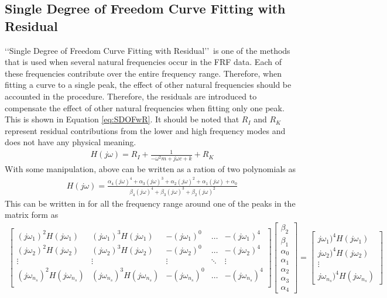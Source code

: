 \documentclass[paper=a4, fontsize=12pt]{scrartcl} %
\begin{document}
\subsection*{Single Degree of Freedom Curve Fitting with Residual}
\lq\lq Single Degree of Freedom Curve Fitting with Residual\rq\rq\ is one of the methods that is used when several natural frequencies occur in the FRF data. Each of these frequencies contribute over the entire frequency range. Therefore, when fitting a curve to a single peak, the effect of other natural frequencies should be accounted in the procedure. Therefore, the residuals are introduced to compensate the effect of other natural frequencies when fitting only one peak. This is shown in Equation \eqref{eq:SDOFwR}. It should be noted that $R_I$ and $R_K$ represent residual contributions from the lower and high frequency modes and does not have any physical meaning.
%
\begin{gather}\label{eq:SDOFwR}
	H(j\omega) = R_I + \frac{1}{-\omega^2 m + j\omega c + k} + R_K
\end{gather}
%
With some manipulation, above can be written as a ration of two polynomials as
%
\begin{gather}
	H(j\omega) = \frac{\alpha_4 (j\omega)^4 + \alpha_3 (j\omega)^3 + \alpha_2 (j
	\omega)^2 + \alpha_1 (j\omega) + \alpha_0}{\beta_4 (j\omega)^4 + \beta_3 (j
	\omega)^3 + \beta_2 (j\omega)^2}
\end{gather}
%
This can be written in for all the frequency range around one of the peaks in the matrix form as
%
\begin{gather}\label{SDOFwR_matix}
\begin{bmatrix}
	(j\omega_1)^2 H(j\omega_1) & (j\omega_1)^3 H(j\omega_1) & -(j\omega_1)^0 & 
	\dots & -(j\omega_1)^4 \\
	(j\omega_2)^2 H(j\omega_2) & (j\omega_2)^3 H(j\omega_2) & -(j\omega_2)^0 & 
	\dots & -(j\omega_2)^4 \\
	\vdots & \vdots & \vdots & \ddots & \vdots \\
	(j\omega_{n_s})^2 H(j\omega_{n_s}) & (j\omega_{n_s})^3 H(j\omega_{n_s}) & -(j
	\omega_{n_s})^0 & \dots & -(j\omega_{n_s})^4 \\
\end{bmatrix}
\begin{bmatrix}
	\beta_2 \\
	\beta_1 \\
	\alpha_0 \\
	\alpha_1 \\
	\alpha_2 \\
	\alpha_3 \\
	\alpha_4
\end{bmatrix}
=
\begin{bmatrix}
	j\omega_1)^4 H(j\omega_1) \\
	j\omega_2)^4 H(j\omega_2) \\
	\vdots \\
	j\omega_{n_s})^4 H(j\omega_{n_s})
\end{bmatrix}
\end{gather}
\end{document}
